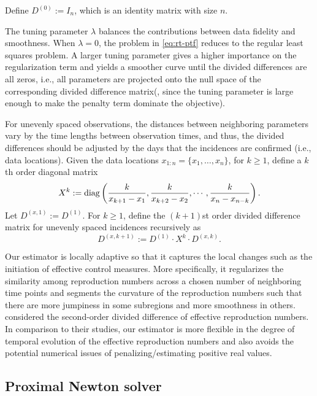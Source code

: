 Define $D^{(0)} := I_n$, which is an identity matrix with size $n$. %

The tuning parameter $\lambda$ balances the contributions between data fidelity and smoothness. When $\lambda=0$, the problem in \eqref{eq:rt-ptf} reduces to the regular least squares problem. A larger tuning parameter gives a higher importance on the regularization term and yields a smoother curve until the divided differences are all zeros, i.e., all parameters are projected onto the null space of the corresponding divided difference matrix(, since the tuning parameter is large enough to make the penalty term dominate the objective). 

For unevenly spaced observations, the distances between neighboring parameters vary by the time lengths between observation times, and thus, the divided differences should be adjusted by the days that the incidences are confirmed (i.e., data locations). Given the data locations $x_{1:n} = \{x_1,\dots,x_n\}$, for $k \geq 1$, define a $k$th order diagonal matrix $$X^k := \operatorname*{diag} \left(\frac{k}{x_{k+1} - x_1}, \frac{k}{x_{k+2} - x_2}, \cdots, \frac{k}{x_n - x_{n-k}} \right).$$ Let $D^{(x,1)} := D^{(1)}$. For $k\geq 1$, define the $(k+1)$st order divided difference matrix for unevenly spaced incidences recursively as $$D^{(x,k+1)} := D^{(1)}\cdot X^k \cdot D^{(x,k)}.$$ 


Our estimator is locally adaptive so that it captures the local changes such as the initiation of effective control measures. More specifically, it regularizes the similarity among reproduction numbers across a chosen number of neighboring time points and segments the curvature of the reproduction numbers such that there are more jumpiness in some subregions and more smoothness in others. 
\cite{abry2020spatial,pascal2022nonsmooth} considered the second-order divided difference of effective reproduction numbers. In comparison to their studies, our estimator is more flexible in the degree of temporal evolution of the effective reproduction numbers and also avoids the potential numerical issues of penalizing/estimating positive real values. 

\subsection{Proximal Newton solver} %

